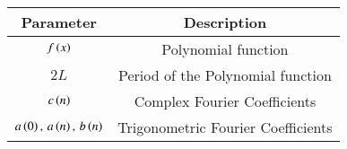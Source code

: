 \begin{tabular}[12pt]{ |c| c|}
    \hline
    \textbf{Parameter} & \textbf{Description}\\ 
    \hline
    $f\left(x\right)$ & Polynomial function\\
    \hline
    $2L$& Period of the Polynomial function\\ 
    \hline
    $c\left(n\right)$ & Complex Fourier Coefficients\\
    \hline
    $a\left(0\right),\,a\left(n\right),\,b\left(n\right)$& Trigonometric Fourier Coefficients\\
    \hline   
    \end{tabular}